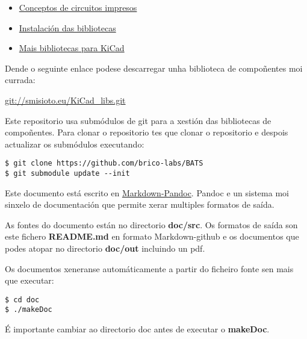 \begin{itemize}
\itemsep1pt\parskip0pt
\item
  \href{http://www.pcb.electrosoft.cl/04-articulos-circuitos-impresos-desarrollo-sistemas/01-conceptos-circuitos-impresos/conceptos-circuitos-impresos-pcb.html}{Conceptos
  de circuitos impresos}
\item
  \href{http://www.arunet.co.uk/tkboyd/ele2pcbka.htm}{Instalación das
  bibliotecas}
\item
  \href{http://www.kicadlib.org/}{Mais bibliotecas para KiCad}
\end{itemize}

Dende o seguinte enlace podese descarregar unha biblioteca de
compoñentes moi currada:

\url{git://smisioto.eu/KiCad_libs.git}


Este repositorio usa submódulos de git para a xestión das bibliotecas de
compoñentes. Para clonar o repositorio tes que clonar o repositorio e
despois actualizar os submódulos executando:

\begin{verbatim}
$ git clone https://github.com/brico-labs/BATS
$ git submodule update --init
\end{verbatim}

Este documento está escrito en
\href{http://pandoc.org/README.html}{Markdown-Pandoc}. Pandoc e un
sistema moi sinxelo de documentación que permite xerar multiples
formatos de saída.

As fontes do documento están no directorio \textbf{doc/src}. Os formatos
de saída son este fichero \textbf{README.md} en formato Markdown-github
e os documentos que podes atopar no directorio \textbf{doc/out}
incluindo un pdf.

Os documentos xeneranse automáticamente a partir do ficheiro fonte sen
mais que executar:

\begin{verbatim}
$ cd doc
$ ./makeDoc
\end{verbatim}

É importante cambiar ao directorio doc antes de executar o
\textbf{makeDoc}.
